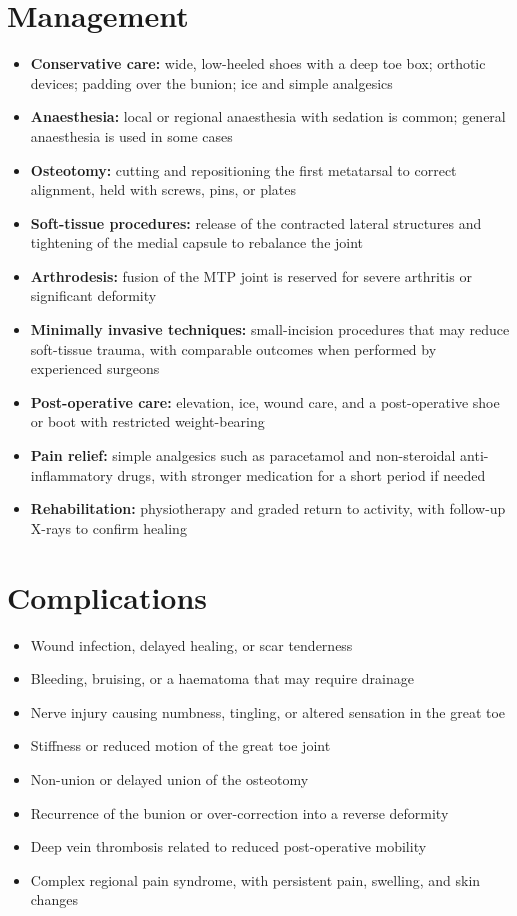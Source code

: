 \section*{Management}
\begin{itemize}
    \item \textbf{Conservative care:} wide, low-heeled shoes with a deep toe box; orthotic devices; padding over the bunion; ice and simple analgesics
    \item \textbf{Anaesthesia:} local or regional anaesthesia with sedation is common; general anaesthesia is used in some cases
    \item \textbf{Osteotomy:} cutting and repositioning the first metatarsal to correct alignment, held with screws, pins, or plates
    \item \textbf{Soft-tissue procedures:} release of the contracted lateral structures and tightening of the medial capsule to rebalance the joint
    \item \textbf{Arthrodesis:} fusion of the MTP joint is reserved for severe arthritis or significant deformity
    \item \textbf{Minimally invasive techniques:} small-incision procedures that may reduce soft-tissue trauma, with comparable outcomes when performed by experienced surgeons
    \item \textbf{Post-operative care:} elevation, ice, wound care, and a post-operative shoe or boot with restricted weight-bearing
    \item \textbf{Pain relief:} simple analgesics such as paracetamol and non-steroidal anti-inflammatory drugs, with stronger medication for a short period if needed
    \item \textbf{Rehabilitation:} physiotherapy and graded return to activity, with follow-up X-rays to confirm healing
\end{itemize}

\section*{Complications}
\begin{itemize}
    \item Wound infection, delayed healing, or scar tenderness
    \item Bleeding, bruising, or a haematoma that may require drainage
    \item Nerve injury causing numbness, tingling, or altered sensation in the great toe
    \item Stiffness or reduced motion of the great toe joint
    \item Non-union or delayed union of the osteotomy
    \item Recurrence of the bunion or over-correction into a reverse deformity
    \item Deep vein thrombosis related to reduced post-operative mobility
    \item Complex regional pain syndrome, with persistent pain, swelling, and skin changes
\end{itemize}

